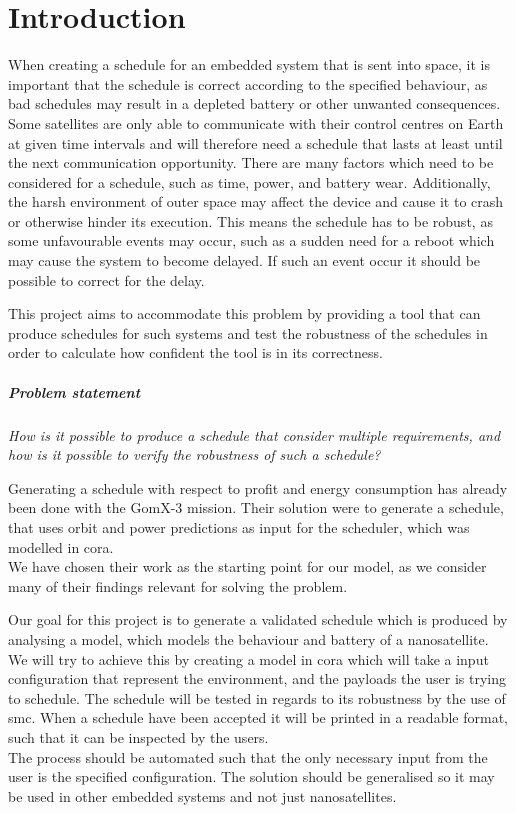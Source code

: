 \chapter{Introduction} \label{cha:intro}
When creating a schedule for an embedded system that is sent into space, it is important that the schedule is correct according to the specified behaviour, as bad schedules may result in a depleted battery or other unwanted consequences. 
Some satellites are only able to communicate with their control centres on Earth at given time intervals and will therefore need a schedule that lasts at least until the next communication opportunity.
There are many factors which need to be considered for a schedule, such as time, power, and battery wear. 
Additionally, the harsh environment of outer space may affect the device and cause it to crash or otherwise hinder its execution.
This means the schedule has to be robust, as some unfavourable events may occur, such as a sudden need for a reboot which may cause the system to become delayed. 
If such an event occur it should be possible to correct for the delay.

This project aims to accommodate this problem by providing a tool that can produce schedules for such systems and test the robustness of the schedules in order to calculate how confident the tool is in its correctness.

\paragraph{Problem statement}
\textit{How is it possible to produce a schedule that consider multiple requirements, and how is it possible to verify the robustness of such a schedule?}

Generating a schedule with respect to profit and energy consumption has already been done with the GomX-3 mission\cite{gomx3}.
Their solution were to generate a schedule, that uses orbit and power predictions as input for the scheduler, which was modelled in \gls{cora}.\\
We have chosen their work as the starting point for our model, as we consider many of their findings relevant for solving the problem.

Our goal for this project is to generate a validated schedule which is produced by analysing a model, which models the behaviour and battery of a nanosatellite.\\
We will try to achieve this by creating a model in \gls{cora} which will take a input configuration that represent the environment, and the payloads the user is trying to schedule.
The schedule will be tested in regards to its robustness by the use of \gls{smc}. %
When a schedule have been accepted it will be printed in a readable format, such that it can be inspected by the users.\\
The process should be automated such that the only necessary input from the user is the specified configuration.
The solution should be generalised so it may be used in other embedded systems and not just nanosatellites.
